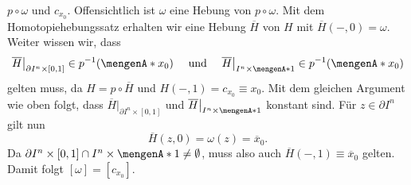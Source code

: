 \begin{description}
	$p \circ \omega$ und $c_{x_0}$. Offensichtlich ist $\omega$ eine Hebung von $p \circ \omega$. Mit dem Homotopiehebungssatz erhalten wir eine Hebung $\overline{H}$ von
	$H$ mit $\overline{H}(-,0) = \omega$. Weiter wissen wir, dass
	\[
		\overline{H} \big|_{\partial I^n \times [0,1]} \in p ^{-1}(\set{x_0} ) \quad \text{ und }\quad  \overline{H} \big|_{ I^n \times \set{1}} \in p ^{-1}(\set{x_0} )
	\]
	gelten muss, da $H = p \circ \overline{H}$ und $H(-,1)= c_{x_0} \equiv x_0$. Mit dem gleichen Argument wie oben folgt, dass 
	$\overline{H} \big|_{\partial I^n \times [0,1]}$ und $\overline{H} \big|_{ I^n \times \set{1}}$ konstant sind. Für $z \in \partial I^n$ gilt nun
	\[
		\overline{H}(z,0) = \omega(z) = \overline{x}_0.  
	\]
	Da $\partial I^n \times [0,1] \cap I^n \times \set{1} \not= \emptyset$, muss also auch $\overline{H}(-,1) \equiv \overline{x}_0$ gelten. Damit folgt
	$[\omega] = [c_{x_0}]$. \bewende
\end{description}
\cleardoubleoddemptypage
{}
\setcounter{page}{1}
\printindex
\listoffigures

